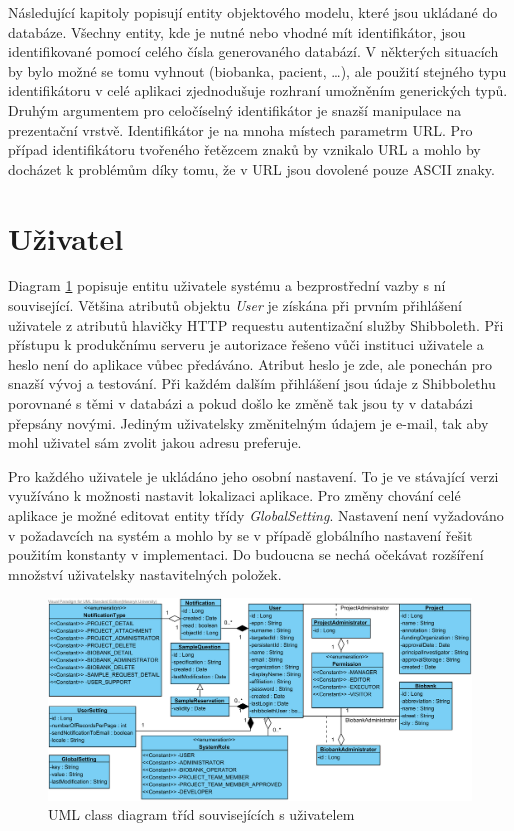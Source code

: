 Následující kapitoly popisují entity objektového modelu, které jsou ukládané do databáze. Všechny entity, kde je nutné nebo vhodné mít identifikátor, jsou identifikované pomocí celého čísla generovaného databází. V některých situacích by bylo možné se tomu vyhnout (biobanka, pacient, \ldots), ale použití stejného typu identifikátoru v celé aplikaci zjednodušuje rozhraní umožněním generických typů. Druhým argumentem pro celočíselný identifikátor je snazší manipulace na prezentační vrstvě. Identifikátor je na mnoha místech parametrm URL. Pro případ identifikátoru tvořeného řetězcem znaků by vznikalo  URL a mohlo by docházet k problémům díky tomu, že v URL jsou dovolené pouze ASCII znaky.

\section{Uživatel}
Diagram \ref{fig:index:uml:class:user} popisuje entitu uživatele systému a bezprostřední vazby s ní související. Většina atributů objektu \textit{User} je získána při prvním přihlášení uživatele z atributů hlavičky HTTP requestu autentizační služby Shibboleth. Při přístupu k produkčnímu serveru je autorizace řešeno vůči  instituci uživatele a heslo není do aplikace vůbec předáváno. Atribut heslo je zde, ale ponechán pro snazší vývoj a testování.
Při každém dalším přihlášení jsou údaje z Shibbolethu porovnané s těmi v databázi a pokud došlo ke změně tak jsou ty v databázi přepsány novými. Jediným uživatelsky změnitelným údajem je e-mail, tak aby mohl uživatel sám zvolit jakou adresu preferuje.

Pro každého uživatele je ukládáno jeho osobní nastavení. To je ve stávající verzi využíváno k možnosti nastavit lokalizaci aplikace. Pro změny chování celé aplikace je možné editovat entity třídy \textit{GlobalSetting}. Nastavení není vyžadováno v požadavcích na systém a mohlo by se v případě globálního nastavení řešit použitím konstanty v implementaci. Do budoucna se nechá očekávat rozšíření množství uživatelsky nastavitelných položek.

\begin{figure}[h!]
\begin{center}
	\includegraphics[width=\textwidth]{UserView}
\caption{UML class diagram tříd souvisejících s uživatelem}
\label{fig:index:uml:class:user}
\end{center}
\end{figure}


